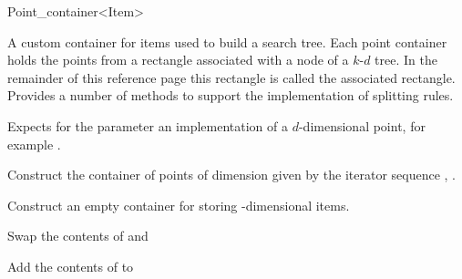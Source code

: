 

\begin{ccRefClass}{Point_container<Item>}  %


\begin{ccAdvanced}



\ccDefinition
A custom container for items used to build a search tree. Each point container
holds the points from a rectangle associated with a node of a $k$-$d$ tree.
In the remainder of this reference page this rectangle is called the
associated rectangle.
Provides a number of methods
to support the implementation of splitting rules.


\ccParameters

Expects for the parameter  an implementation of 
a $d$-dimensional point, for example .

\ccTypes



\ccCreation
{}

{
Construct the container of points of dimension 
given by the iterator sequence , .
}

{
Construct an empty container for storing -dimensional items.
}


{Swap the contents of  and }

{Add the contents of  to }


\end{ccAdvanced}
\end{ccRefClass}
